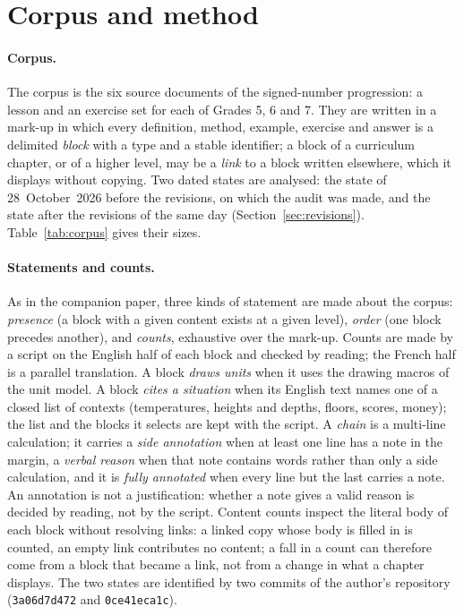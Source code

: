 \documentclass[11pt,a4paper]{article}
\theoremstyle{definition}
\begin{document}
\section{Corpus and method}\label{sec:method}

\paragraph{Corpus.} The corpus is the six source documents of the signed-number progression: a lesson and an exercise set for each of Grades 5, 6 and 7. They are written in a mark-up in which every definition, method, example, exercise and answer is a delimited \emph{block} with a type and a stable identifier; a block of a curriculum chapter, or of a higher level, may be a \emph{link} to a block written elsewhere, which it displays without copying. Two dated states are analysed: the state of 28~October~2026 before the revisions, on which the audit was made, and the state after the revisions of the same day (Section~\ref{sec:revisions}). Table~\ref{tab:corpus} gives their sizes.

\paragraph{Statements and counts.} As in the companion paper, three kinds of statement are made about the corpus: \emph{presence} (a block with a given content exists at a given level), \emph{order} (one block precedes another), and \emph{counts}, exhaustive over the mark-up. Counts are made by a script on the English half of each block and checked by reading; the French half is a parallel translation. A block \emph{draws units} when it uses the drawing macros of the unit model. A block \emph{cites a situation} when its English text names one of a closed list of contexts (temperatures, heights and depths, floors, scores, money); the list and the blocks it selects are kept with the script. A \emph{chain} is a multi-line calculation; it carries a \emph{side annotation} when at least one line has a note in the margin, a \emph{verbal reason} when that note contains words rather than only a side calculation, and it is \emph{fully annotated} when every line but the last carries a note. An annotation is not a justification: whether a note gives a valid reason is decided by reading, not by the script. Content counts inspect the literal body of each block without resolving links: a linked copy whose body is filled in is counted, an empty link contributes no content; a fall in a count can therefore come from a block that became a link, not from a change in what a chapter displays. The two states are identified by two commits of the author's repository (\texttt{3a06d7d472} and \texttt{0ce41eca1c}).
\end{document}
